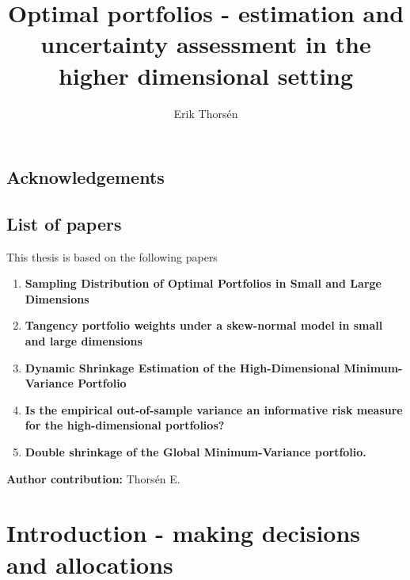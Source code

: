 \documentclass[]{book}\usepackage{knitr}
\title{Optimal portfolios - estimation and uncertainty assessment in the higher dimensional setting}
\author{Erik Thorsén}
\begin{document}


\maketitle

\section*{Acknowledgements}

\newpage
\section*{List of papers}
\nocite{bodnar2020sampling, javed2021tangency, bodnar2021dynamic, bodnar2021empirical}
This thesis is based on the following papers

\begin{enumerate}[I]
  \item \textbf{Sampling Distribution of Optimal Portfolios in Small and Large Dimensions}
  \item \textbf{Tangency portfolio weights under a skew-normal model in small and large dimensions}
  \item \textbf{Dynamic Shrinkage Estimation of the High-Dimensional Minimum-Variance Portfolio}
  \item \textbf{Is the empirical out-of-sample variance an informative risk measure for the high-dimensional portfolios?}
  \item \textbf{Double shrinkage of the Global Minimum-Variance portfolio.}
\end{enumerate}
\textbf{Author contribution:} Thors{\'e}n E.

%  




\tableofcontents
\chapter[Introduction]{Introduction - making decisions and allocations}\label{ch:intro}

\end{document}
